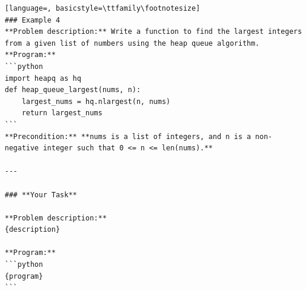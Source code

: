 \documentclass[sigconf]{acmart}
\begin{document}
\begin{tcolorbox}[ colback=gray!10, colframe=black, arc=5pt]
\begin{lstlisting}[language=, basicstyle=\ttfamily\footnotesize]
### Example 4 
**Problem description:** Write a function to find the largest integers from a given list of numbers using the heap queue algorithm.  
**Program:**
```python
import heapq as hq
def heap_queue_largest(nums, n):
    largest_nums = hq.nlargest(n, nums)
    return largest_nums
```
**Precondition:** **nums is a list of integers, and n is a non-negative integer such that 0 <= n <= len(nums).**

---

### **Your Task**

**Problem description:**  
{description}

**Program:**
```python
{program}
```

\end{lstlisting}
\end{tcolorbox}
\clearpage
\flushbottom
\end{document}
